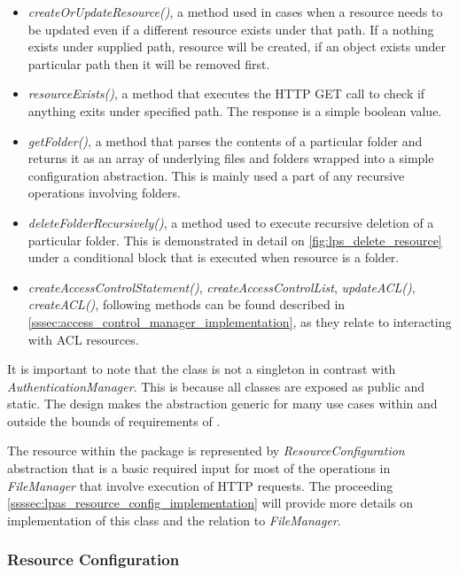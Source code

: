 \begin{itemize}
    \item \textit{createOrUpdateResource()}, a method used in cases when a resource needs to be updated even if a different resource exists under that path. If a nothing exists under supplied path, resource will be created, if an object exists under particular path then it will be removed first.
    \item \textit{resourceExists()}, a method that executes the HTTP GET call to check if anything exits under specified path. The response is a simple boolean value.
    \item \textit{getFolder()}, a method that parses the contents of a particular folder and returns it as an array of underlying files and folders wrapped into a simple configuration abstraction. This is mainly used a part of any recursive operations involving folders.
    \item \textit{deleteFolderRecursively()}, a method used to execute recursive deletion of a particular folder. This is demonstrated in detail on \autoref{fig:lps_delete_resource} under a conditional block that is executed when resource is a folder.  
    \item \textit{createAccessControlStatement()}, \textit{createAccessControlList}, \textit{updateACL()}, \newline{} \textit{createACL()}, following methods can be found described in \autoref{sssec:access_control_manager_implementation}, as they relate to interacting with ACL resources.
\end{itemize}

It is important to note that the class is not a singleton in contrast with \textit{AuthenticationManager}. This is because all classes are exposed as public and static. The design makes the abstraction generic for many use cases within and outside the bounds of requirements of \lpa{}.

The \solid{} resource within the \lpas{} package is represented by \textit{ResourceConfiguration} abstraction that is a basic required input for most of the operations in \textit{FileManager} that involve execution of HTTP requests. The proceeding \autoref{ssssec:lpas_resource_config_implementation} will provide more details on implementation of this class and the relation to \textit{FileManager}.
 
\subsubsection{Resource Configuration}
\label{ssssec:lpas_resource_config_implementation}

